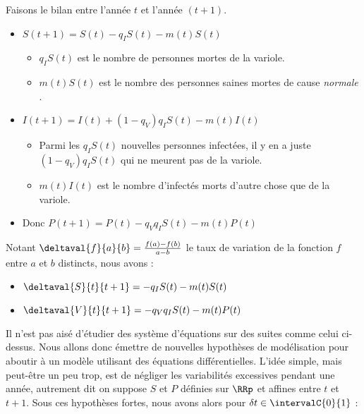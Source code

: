 

\medskip


Faisons le bilan entre l'année $t$ et l'année $(t + 1)$.

\begin{itemize}[label=\small\textbullet]
	\item $S(t + 1) = S(t) - q_I S(t) - m(t) S(t)$
	\begin{itemize}[label=$\rightarrow$]	
		\item $q_I S(t)$ est le nombre de personnes mortes de la variole.
		
		\item $m(t) S(t)$ est le nombre des personnes saines mortes de cause \emph{\og normale \fg}.
	\end{itemize}


	\item $I(t + 1) = I(t) + (1 - q_V) q_I S(t) - m(t) I(t)$
	\begin{itemize}[label=$\rightarrow$]	
		\item Parmi les $q_I S(t)$ nouvelles personnes infectées, il y en a juste $(1 - q_V) q_I S(t)$ qui ne meurent pas de la variole.
		
		\item $m(t) I(t)$ est le nombre d'infectés morts d'autre chose que de la variole.
	\end{itemize}


	\item Donc $P(t + 1) = P(t) - q_V q_I S(t) - m(t) P(t)$
\end{itemize}


Notant $\deltaval{f}{a}{b} = \frac{f(a) - f(b)}{a - b}$ le taux de variation de la fonction $f$ entre $a$ et $b$ distincts, nous avons :

\begin{itemize}[label=\small\textbullet]
	\item $\deltaval{S}{t}{t+1} = - q_I S(t) - m(t) S(t)$

	\item $\deltaval{V}{t}{t+1} = - q_V q_I S(t) - m(t) P(t)$
\end{itemize}




\medskip


Il n'est pas aisé d'étudier des système d'équations sur des suites comme celui ci-dessus. Nous allons donc émettre de nouvelles hypothèses de modélisation pour aboutir à un modèle utilisant des équations différentielles. L'idée simple, mais peut-être un peu trop, est de négliger les variabilités excessives pendant une année, autrement dit on suppose $S$ et $P$ définies sur $\RRp$ et affines entre $t$ et $t+1$. Sous ces hypothèses fortes, nous avons alors pour $\delta t \in \intervalC{0}{1}$ :

